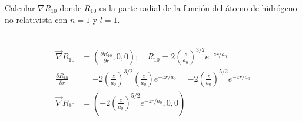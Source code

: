 Calcular $\nabla R_{10}$ donde $R_{10}$ es la parte radial de la función del átomo de hidrógeno no relativista con $n=1$ y $l=1$. 

\begin{solution}\ \\
$$
\begin{aligned}
\vec{\nabla} R_{10} &=\left(\frac{\partial R_{10}}{\partial r}, 0,0\right) ; \quad 
R_{10}=2\left(\frac{z}{a_{0}}\right)^{3/2} e^{-z r/{a_{0}}} \\
\frac{\partial R_{10}}{\partial r} &=-2\left(\frac{z}{a_{0}}\right)^{3 / 2}\left(\frac{z}{a_{0}}\right) e^{-zr/{a_{0}}}=-2\left(\frac{z}{a_{0}}\right)^{5 / 2}  e^{-zr/{a_{0}}} \\
\vec{\nabla} R_{10} &=\left(-2\left(\frac{z}{a_{0}}\right)^{5 / 2}  e^{-zr/{a_{0}}}, 0,0\right)
\end{aligned}
$$
\end{solution}